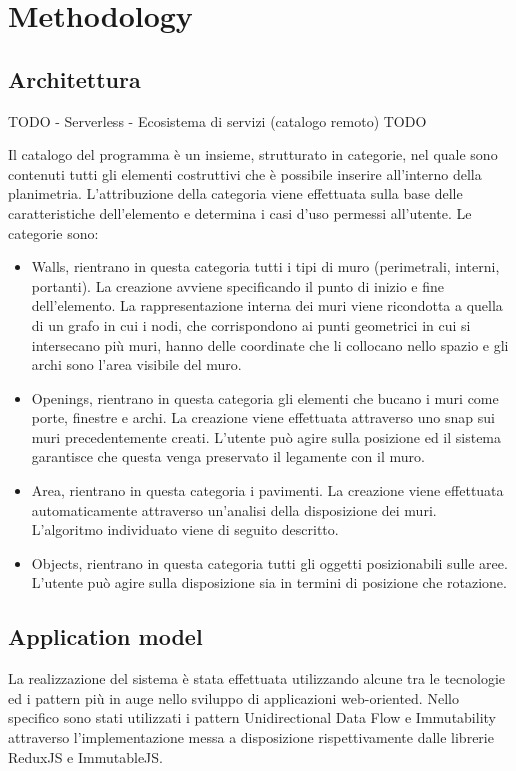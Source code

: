 \section{Methodology}

\subsection{Architettura}

TODO
- Serverless
- Ecosistema di servizi (catalogo remoto)
TODO



Il catalogo del programma è un insieme, strutturato in categorie, nel quale sono contenuti tutti gli elementi costruttivi che è possibile inserire all’interno della planimetria. L’attribuzione della categoria viene effettuata sulla base delle caratteristiche dell’elemento e determina i casi d’uso permessi all’utente.
Le categorie sono:
\begin{itemize}
\item Walls, rientrano in questa categoria tutti i tipi di muro (perimetrali, interni, portanti). La creazione avviene specificando il punto di inizio e fine dell’elemento. La rappresentazione interna dei muri viene ricondotta a quella di un grafo in cui i nodi, che corrispondono ai punti geometrici in cui si intersecano più muri, hanno delle coordinate che li collocano nello spazio e gli archi sono l’area visibile del muro.
\item Openings, rientrano in questa categoria gli elementi che bucano i muri come porte, finestre e archi. La creazione viene effettuata attraverso uno snap sui muri precedentemente creati. L’utente può agire sulla posizione ed il sistema garantisce che questa venga preservato il legamente con il muro.
\item Area, rientrano in questa categoria i pavimenti. La creazione viene effettuata automaticamente attraverso un’analisi della disposizione dei muri. L’algoritmo individuato viene di seguito descritto.
\item Objects, rientrano in questa categoria tutti gli oggetti posizionabili sulle aree. L’utente può agire sulla disposizione sia in termini di posizione che rotazione.
\end{itemize}

\subsection{Application model}
La realizzazione del sistema è stata effettuata utilizzando alcune tra le tecnologie ed i pattern più in auge nello sviluppo di applicazioni web-oriented. Nello specifico sono stati utilizzati i pattern Unidirectional Data Flow e Immutability attraverso l’implementazione messa a disposizione rispettivamente dalle librerie ReduxJS e ImmutableJS.


